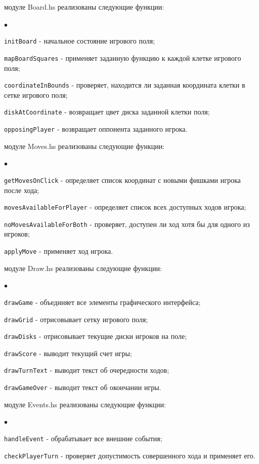 \documentclass[oneside,final,14pt]{extreport}
\newenvironment{compactlist}{
    \begin{list}
    {{$\bullet$}}
    {
        \setlength\partopsep{0pt}
        \setlength\parskip{0pt}
        \setlength\parsep{5pt}
        \setlength\topsep{5pt}
        \setlength\itemsep{0pt}                        
    }
}{
    \end{list}
}
\begin{document}
 модуле Board.hs реализованы следующие функции:
\begin{compactlist}
    \item {\tt initBoard} - начальное состояние игрового поля;
    \item {\tt mapBoardSquares} - применяет заданную функцию к каждой клетке игрового поля;
    \item {\tt coordinateInBounds} - проверяет, находится ли заданная координата  клетки в сетке игрового поля;
    \item {\tt diskAtCoordinate} - возвращает цвет диска заданной клетки поля;
    \item {\tt opposingPlayer} - возвращает оппонента заданного игрока.
\end{compactlist}
\vspace{3mm}
 модуле Moves.hs реализованы следующие функции:
\begin{compactlist}
    \item {\tt getMovesOnClick} - определяет список координат с новыми фишками игрока после хода;
    \item {\tt movesAvailableForPlayer} - определяет список всех доступных ходов игрока;
    \item {\tt noMovesAvailableForBoth} - проверяет, доступен ли ход хотя бы для одного из игроков;
    \item {\tt applyMove} - применяет ход игрока.
\end{compactlist}
\vspace{3mm}
 модуле Draw.hs реализованы следующие функции:
\begin{compactlist}
    \item {\tt drawGame} - объединяет все элементы графического интерфейса;
    \item {\tt drawGrid} - отрисовывает сетку игрового поля;
    \item {\tt drawDisks} - отрисовывает текущие диски игроков на поле;
    \item {\tt drawScore} - выводит текущий счет игры;
    \item {\tt drawTurnText} - выводит текст об очередности ходов;
    \item {\tt drawGameOver} - выводит текст об окончании игры.
\end{compactlist}
\vspace{3mm}
 модуле Events.hs реализованы следующие функции:
\begin{compactlist}
    \item {\tt handleEvent} - обрабатывает все внешние события;
    \item {\tt checkPlayerTurn} - проверяет допустимость совершенного хода и применяет его.
\end{compactlist}
\end{document}
